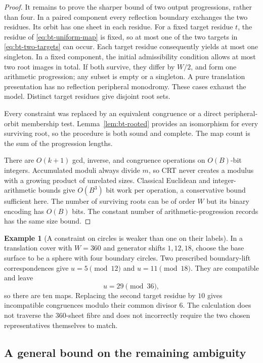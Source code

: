 \documentclass[11pt]{article}
\theoremstyle{definition}
\newtheorem{example}[theorem]{Example}
\theoremstyle{remark}
\begin{document}
\begin{proof}
It remains to prove the sharper bound of two output progressions, rather
than four.  In a paired component every reflection boundary exchanges the
two residues.  Its orbit has one sheet in each residue.  For a fixed target
residue $t$, the residue of \eqref{eq:bt-uniform-map} is fixed, so at most
one of the two targets in \eqref{eq:bt-two-targets} can occur.  Each target
residue consequently yields at most one singleton.  In a fixed component,
the initial admissibility condition allows at most two root images in
total.  If both survive, they differ by $W/2$, and form one arithmetic
progression; any subset is empty or a singleton.  A pure translation
presentation has no reflection peripheral monodromy.  These cases exhaust
the model.  Distinct target residues give disjoint root sets.

Every constraint was replaced by an equivalent congruence or a direct
peripheral-orbit membership test.  Lemma~\ref{lem:bt-rooted} provides an
isomorphism for every surviving root, so the procedure is both sound and
complete.  The map count is the sum of the progression lengths.

There are $O(k+1)$ gcd, inverse, and congruence operations on $O(B)$-bit
integers.  Accumulated moduli always divide $m$, so CRT never creates a
modulus with a growing product of unrelated sizes.  Classical Euclidean
and integer-arithmetic bounds give $O(B^3)$ bit work per operation, a
conservative bound sufficient here.  The number of surviving roots can
be of order $W$ but its binary encoding has $O(B)$ bits.  The constant
number of arithmetic-progression records has the same size bound.
\end{proof}

\begin{example}[A constraint on circles is weaker than one on their labels]
In a translation cover with $W=360$ and generator shifts $1,12,18$, choose
the base surface to be a sphere with four boundary circles.  Two prescribed
boundary-lift correspondences give
$u=5\pmod{12}$ and $u=11\pmod{18}$.  They are compatible and leave
\[
 u=29\pmod{36},
\]
so there are ten maps.  Replacing the second target residue by $10$ gives
incompatible congruences modulo their common divisor $6$.  The calculation
does not traverse the $360$-sheet fibre and does not incorrectly require
the two chosen representatives themselves to match.
\end{example}

\subsection{A general bound on the remaining ambiguity}
\end{document}
